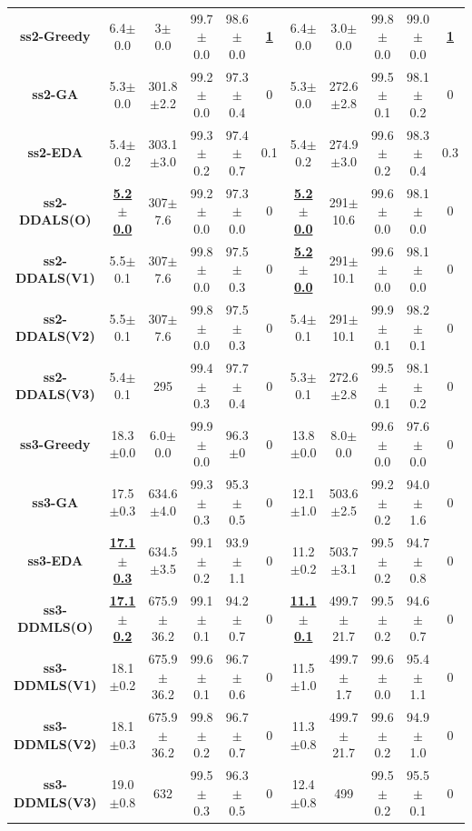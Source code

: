 \documentclass[lettersize,journal]{IEEEtran}
\begin{document}
\begin{table}[!t]
{\begin{tabular}{ccccccccccc}
        \midrule
        {\bfseries ss2-Greedy} & 6.4$\pm$0.0 & 3$\pm$0.0 & 99.7$\pm$0.0 &98.6$\pm$0.0 &\underline{\bfseries 1} &6.4$\pm$0.0&3.0$\pm$0.0& 99.8$\pm$0.0&99.0$\pm$0.0  &\underline{\bfseries 1} \\
        {\bfseries ss2-GA} &5.3$\pm$0.0&301.8$\pm$2.2 & 99.2$\pm$0.0&97.3$\pm$0.4&0&5.3$\pm$0.0&272.6$\pm$2.8& 99.5$\pm$0.1&98.1$\pm$0.2  &0 \\
        {\bfseries ss2-EDA} &5.4$\pm$0.2&303.1$\pm$3.0 & 99.3$\pm$0.2&97.4$\pm$0.7&0.1&5.4$\pm$0.2&274.9$\pm$3.0& 99.6$\pm$0.2&98.3$\pm$0.4  &0.3 \\
        {\bfseries ss2-DDALS(O)} &\underline{\bfseries 5.2$\pm$0.0} &307$\pm$7.6 & 99.2$\pm$0.0&97.3$\pm$0.0&0 &\underline{\bfseries 5.2$\pm$0.0} &291$\pm$10.6& 99.6$\pm$0.0&98.1$\pm$0.0  &0 \\
        {\bfseries ss2-DDALS(V1)} &5.5$\pm$0.1&307$\pm$7.6 & 99.8$\pm$0.0&97.5$\pm$0.3&0 &\underline{\bfseries 5.2$\pm$0.0} &291$\pm$10.1& 99.6$\pm$0.0&98.1$\pm$0.0  &0 \\
        {\bfseries ss2-DDALS(V2)} &5.5$\pm$0.1&307$\pm$7.6 & 99.8$\pm$0.0&97.5$\pm$0.3&0&5.4$\pm$0.1&291$\pm$10.1& 99.9$\pm$0.1&98.2$\pm$0.1  &0 \\
        {\bfseries ss2-DDALS(V3)} &5.4$\pm$0.1&295 & 99.4$\pm$0.3&97.7$\pm$0.4&0&5.3$\pm$0.1&272.6$\pm$2.8& 99.5$\pm$0.1&98.1$\pm$0.2  &0 \\
        
        \midrule
        {\bfseries ss3-Greedy} &18.3$\pm$0.0 &6.0$\pm$0.0 & 99.9$\pm$0.0 &96.3$\pm$0 &0 &13.8$\pm$0.0 &8.0$\pm$0.0 & 99.6$\pm$0.0 &97.6$\pm$0.0 &0 \\
        {\bfseries ss3-GA} &17.5$\pm$0.3 &634.6$\pm$4.0 & 99.3$\pm$0.3 &95.3$\pm$0.5 &0 &12.1$\pm$1.0 &503.6$\pm$2.5& 99.2$\pm$0.2 &94.0$\pm$1.6 &0 \\
        {\bfseries ss3-EDA} &\underline{\bfseries17.1$\pm$0.3} &634.5$\pm$3.5 & 99.1$\pm$0.2 &93.9$\pm$1.1 &0 &11.2$\pm$0.2 &503.7$\pm$3.1& 99.5$\pm$0.2 &94.7$\pm$0.8 &0 \\
        {\bfseries ss3-DDMLS(O)} &\underline{\bfseries17.1$\pm$0.2} &675.9$\pm$36.2 & 99.1$\pm$0.1 &94.2$\pm$0.7 &0 &\underline{\bfseries11.1$\pm$0.1} &499.7$\pm$21.7& 99.5$\pm$0.2 &94.6$\pm$0.7 &0 \\
        {\bfseries ss3-DDMLS(V1)} &18.1$\pm$0.2 &675.9$\pm$36.2 & 99.6$\pm$0.1 &96.7$\pm$0.6 &0 &11.5$\pm$1.0 &499.7$\pm$ 1.7& 99.6$\pm$0.0 &95.4$\pm$1.1 &0 \\
        {\bfseries ss3-DDMLS(V2)} &18.1$\pm$0.3 &675.9$\pm$36.2 & 99.8$\pm$0.2 &96.7$\pm$0.7 &0 &11.3$\pm$0.8 &499.7$\pm$21.7& 99.6$\pm$0.2 &94.9$\pm$1.0 &0 \\
        {\bfseries ss3-DDMLS(V3)} &19.0$\pm$0.8 &632 & 99.5$\pm$0.3 &96.3$\pm$0.5 &0 &12.4$\pm$0.8 &499& 99.5$\pm$0.2 &95.5$\pm$0.1 &0 \\
        

\end{tabular}}
\end{table}
\end{document}
